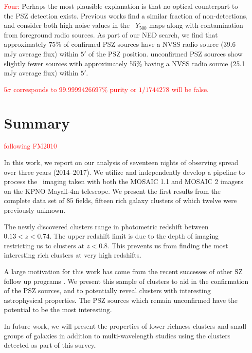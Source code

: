 \documentclass[apj, revtex4-1]{emulateapj}
\newcommand{\editorial}[1]{\textcolor{red}{#1}}
\begin{document}
\editorial{Four:} Perhaps the most plausible explanation is that no optical counterpart to the PSZ detection exists. Previous works  find a similar fraction of non-detections, and consider both high noise values in the \planck\ $Y_{500}$ maps \citep{PlanckCollaboration2014a} along with contamination from foreground radio sources. As part of our NED search, we find that approximately 75\% of confirmed PSZ sources have a NVSS radio source (39.6 mJy average flux) within $5'$ of the PSZ position. unconfirmed PSZ sources show slightly fewer sources with approximately 55\% having a NVSS radio source (25.1 mJy average flux) within $5'$.

\editorial{$5\sigma$ corresponds to 99.9999426697\% purity or $1/1744278$ will be false.}

\section{Summary}\label{sec:summary}

\editorial{following FM2010}

In this work, we report on our analysis of seventeen nights of observing spread over three years (2014--2017). We utilize and independently develop a pipeline to process the \sdssg\sdssr\sdssi\sdssz\ imaging taken with both the MOSAIC 1.1 and MOSAIC 2 imagers on the KPNO Mayall-4m telescope. We present the first results from the complete data set of 85 fields, fifteen rich galaxy clusters of which twelve were previously unknown.

The newly discovered clusters range in photometric redshift between $0.13 < z < 0.74$. The upper redshift limit is due to the depth of imaging restricting us to clusters at $z<0.8$. This prevents us from finding the most interesting rich clusters at very high redshifts.

A large motivation for this work has come from the recent successes of other SZ follow up programs . We present this sample of clusters to aid in the confirmation of the PSZ sources, and to potentially reveal clusters with interesting astrophysical properties. The PSZ sources which remain unconfirmed have the potential to be the most interesting.

In future work, we will present the properties of lower richness clusters and small groups of galaxies in addition to multi-wavelength studies using the clusters detected as part of this survey.
\end{document}
